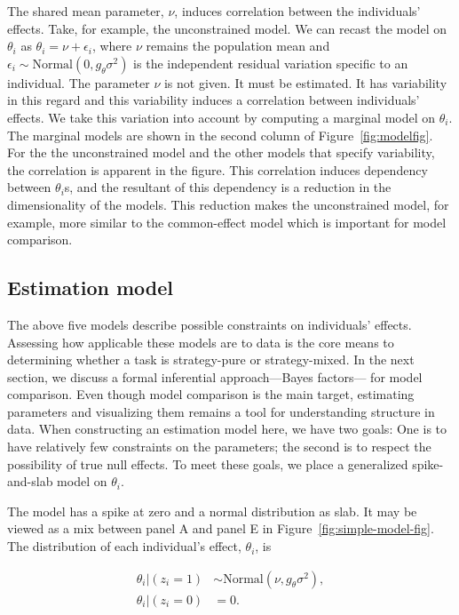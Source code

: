 \documentclass[english,man]{apa6}
\theoremstyle{definition}
\theoremstyle{definition}
\theoremstyle{remark}
\begin{document}
The shared mean parameter, \(\nu\), induces correlation between the
individuals' effects. Take, for example, the unconstrained model. We can
recast the model on \(\theta_i\) as \(\theta_i = \nu + \epsilon_i\),
where \(\nu\) remains the population mean and
\(\epsilon_i \sim \mbox{Normal}(0, g_\theta \sigma^2)\) is the
independent residual variation specific to an individual. The parameter
\(\nu\) is not given. It must be estimated. It has variability in this
regard and this variability induces a correlation between individuals'
effects. We take this variation into account by computing a marginal
model on \(\theta_i\). The marginal models are shown in the second
column of Figure~\ref{fig:modelfig}. For the the unconstrained model and
the other models that specify variability, the correlation is apparent
in the figure. This correlation induces dependency between
\(\theta_i\)s, and the resultant of this dependency is a reduction in
the dimensionality of the models. This reduction makes the unconstrained
model, for example, more similar to the common-effect model which is
important for model comparison.

\subsection{Estimation model}\label{estimation-model}

The above five models describe possible constraints on individuals'
effects. Assessing how applicable these models are to data is the core
means to determining whether a task is strategy-pure or strategy-mixed.
In the next section, we discuss a formal inferential approach---Bayes
factors--- for model comparison. Even though model comparison is the
main target, estimating parameters and visualizing them remains a tool
for understanding structure in data. When constructing an estimation
model here, we have two goals: One is to have relatively few constraints
on the parameters; the second is to respect the possibility of true null
effects. To meet these goals, we place a generalized spike-and-slab
model on \(\theta_i\).

The model has a spike at zero and a normal distribution as slab. It may
be viewed as a mix between panel A and panel E in
Figure~\ref{fig:simple-model-fig}. The distribution of each individual's
effect, \(\theta_i\), is

\begin{align*}
\theta_i | (z_i = 1) &\sim \mbox{Normal}(\nu, g_\theta \sigma^2),\\
\theta_i | (z_i = 0) &= 0.\\
\end{align*}
\end{document}
